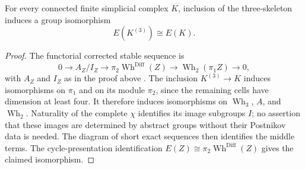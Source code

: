 \begin{lemma}\label{lem:three-skeleton-cycle-presentation}
For every connected finite simplicial complex $K$, inclusion of
the three-skeleton induces a group isomorphism
\[
                              E(K^{(3)})\cong E(K).
\]
\end{lemma}

\begin{proof}
The functorial corrected stable sequence is
\[
 0\longrightarrow A_Z/I_Z\longrightarrow
 \pi_2\operatorname{Wh}^{\mathrm{Diff}}(Z)\longrightarrow
 \operatorname{Wh}_2(\pi_1Z)\longrightarrow0,
\]
with $A_Z$ and $I_Z$ as in the proof above
\cite[Corollary~2.7, p.~250]{Jahren2010}.
The inclusion $K^{(3)}\to K$ induces isomorphisms on $\pi_1$
and on its module $\pi_2$, since the remaining cells have
dimension at least four. It therefore induces isomorphisms on
$\operatorname{Wh}_3$, $A$, and $\operatorname{Wh}_2$.
Naturality of the complete $\chi$ identifies its image subgroups
$I$; no assertion that these images are determined by abstract
groups without their Postnikov data is needed. The diagram of
short exact sequences then identifies the middle terms.
The cycle-presentation identification
$E(Z)\cong\pi_2\operatorname{Wh}^{\mathrm{Diff}}(Z)$ gives the
claimed isomorphism.
\end{proof}
